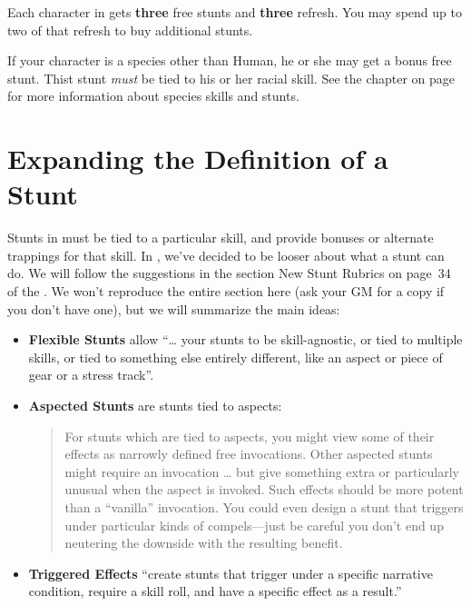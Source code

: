 \documentclass[12pt,titlepage,openany]{book}
\begin{document}
Each character in \StarTrekFate{} gets \textbf{three} free stunts and
\textbf{three} refresh. You may spend up to two of that refresh to buy
additional stunts.

If your character is a species other than Human, he or she may get a bonus free
stunt. Thist stunt \emph{must} be tied to his or her racial skill. See the
 chapter on page~\pageref{chap:species} for more
information about species skills and stunts.

\section{Expanding the Definition of a Stunt}\label{sec:aspect-stunts}

Stunts in \FateCore{} must be tied to a particular skill, and provide bonuses
or alternate trappings for that skill. In \StarTrekFate{}, we've decided to be
looser about what a stunt can do. We will follow the suggestions in the section
New Stunt Rubrics on page~34 of the \FateSystemToolkit{}. We won't reproduce
the entire section here (ask your GM for a copy if you don't have one), but we
will summarize the main ideas:

\begin{itemize}
    \item \textbf{Flexible Stunts} allow ``\ldots{} your stunts to be
        skill-agnostic, or tied to multiple skills, or tied to something else
        entirely different, like an aspect or piece of gear or a stress
        track''.

    \item \textbf{Aspected Stunts} are stunts tied to aspects:
        \begin{quote}
            For stunts which are tied to aspects, you might view some of their
            effects as narrowly defined free invocations. Other aspected stunts
            might require an invocation \ldots{} but give something extra or
            particularly unusual when the aspect is invoked. Such effects
            should be more potent than a ``vanilla'' invocation. You could even
            design a stunt that triggers under particular kinds of
            compels---just be careful you don’t end up neutering the downside
            with the resulting benefit.
        \end{quote}

    \item \textbf{Triggered Effects} ``create stunts that trigger under a
        specific narrative condition, require a skill roll, and have a specific
        effect as a result.''
\end{itemize}
\end{document}
